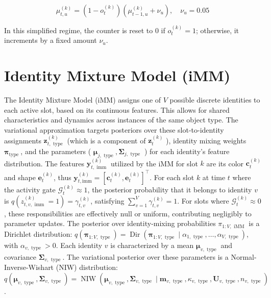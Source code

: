 \documentclass[10pt]{article}
\begin{document}
\begin{equation*}
\mu_{t, u}^{(k)}=\left(1-o_{t}^{(k)}\right)\left(\mu_{t-1, u}^{(k)}+\nu_{u}\right), \quad \nu_{u}=0.05 \tag{47}
\end{equation*}


In this simplified regime, the counter is reset to 0 if $o_{t}^{(k)}=1$; otherwise, it increments by a fixed amount $\nu_{u}$.

\section*{Identity Mixture Model (iMM)}
The Identity Mixture Model (iMM) assigns one of $V$ possible discrete identities to each active slot, based on its continuous features. This allows for shared characteristics and dynamics across instances of the same object type. The variational approximation targets posteriors over these slot-to-identity assignments $\mathbf{z}_{t, \text { type }}^{(k)}$ (which is a component of $\mathbf{z}_{t}^{(k)}$ ), identity mixing weights $\boldsymbol{\pi}_{\text {type }}$, and the parameters ( $\boldsymbol{\mu}_{j, \text { type }}, \boldsymbol{\Sigma}_{j, \text { type }}$ ) for each identity's feature distribution. The features $\mathbf{y}_{t, \text { imm }}^{(k)}$ utilized by the iMM for slot $k$ are its color $\mathbf{c}_{t}^{(k)}$ and shape $\mathbf{e}_{t}^{(k)}$, thus $\mathbf{y}_{t, \mathrm{imm}}^{(k)}=\left[\mathbf{c}_{t}^{(k)}, \mathbf{e}_{t}^{(k)}\right]^{\top}$. For each slot $k$ at time $t$ where the activity gate $\mathcal{G}_{t}^{(k)} \approx 1$, the posterior probability that it belongs to identity $v$ is $q\left(z_{t, v, \text { imm }}^{(k)}=1\right)=\gamma_{t, v}^{(k)}$, satisfying $\sum_{v=1}^{V} \gamma_{t, v}^{(k)}=1$. For slots where $\mathcal{G}_{t}^{(k)} \approx 0$, these responsibilities are effectively null or uniform, contributing negligibly to parameter updates. The posterior over identity-mixing probabilities $\pi_{1: V, \text { iMM }}$ is a Dirichlet distribution: $q\left(\boldsymbol{\pi}_{1: V, \text { type }}\right)=\operatorname{Dir}\left(\boldsymbol{\pi}_{1: V, \text { type }} \mid\right. \left.\alpha_{1, \text { type }}, \ldots, \alpha_{V, \text { type }}\right)$, with $\alpha_{v, \text { type }}>0$. Each identity $v$ is characterized by a mean $\boldsymbol{\mu}_{v, \text { type }}$ and covariance $\boldsymbol{\Sigma}_{v, \text { type }}$. The variational posterior over these parameters is a Normal-Inverse-Wishart (NIW) distribution: $q\left(\boldsymbol{\mu}_{v, \text { type }}, \boldsymbol{\Sigma}_{v, \text { type }}\right)=\operatorname{NIW}\left(\boldsymbol{\mu}_{v, \text { type }}, \boldsymbol{\Sigma}_{v, \text { type }} \mid \boldsymbol{m}_{v, \text { type }}, \kappa_{v, \text { type }}, \mathbf{U}_{v, \text { type }}, n_{v, \text { type }}\right)$.
\end{document}
